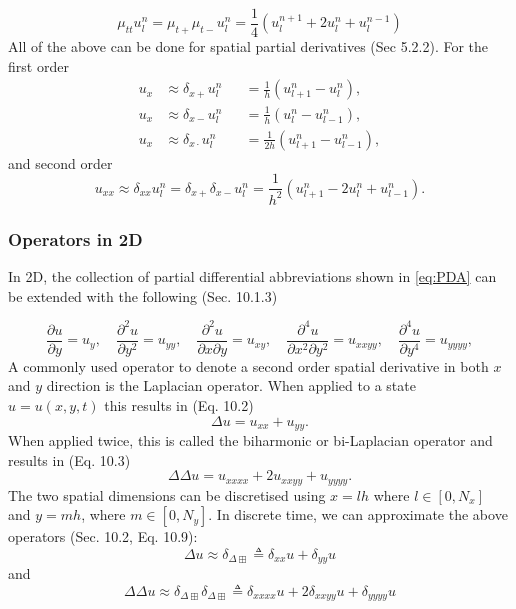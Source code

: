 \documentclass{article}
\begin{document}
\begin{equation}
    \mu_{tt} u_l^n = \mu_{t+}\mu_{t-}u_l^n = \frac{1}{4}(u_l^{n+1}+2u_l^n+u_l^{n-1})
\end{equation}
All of the above can be done for spatial partial derivatives (Sec 5.2.2). For the first order 
\begin{subequations}\label{eq:firstOrderSpace}
\begin{alignat}{2}
    u_x &\approx \delta_{x+}u_l^n &&= \frac{1}{h} (u_{l+1}^n - u_l^n),\\
    u_x &\approx \delta_{x-}u_l^n &&= \frac{1}{h} (u_l^n - u_{l-1}^n),\\
    u_x &\approx \delta_{x\cdot}u_l^n &&= \frac{1}{2h} (u_{l+1}^n - u_{l-1}^n),
\end{alignat}
\end{subequations}
and second order 
\begin{equation}\label{eq:secondOrderSpace}
    u_{xx} \approx \delta_{xx}u_l^n = \delta_{x+}\delta_{x-}u_l^n = \frac{1}{h^2} (u_{l+1}^n - 2u_l^n + u_{l-1}^n).
\end{equation}

\subsubsection{Operators in 2D}\label{subsec:2Doperators}
In 2D, the collection of partial differential abbreviations shown in \eqref{eq:PDA} can be extended with the following (Sec. 10.1.3)

\begin{equation}
    \frac{\partial u}{\partial y} = u_{y}, \quad \frac{\partial^2 u}{\partial y^2} = u_{yy}, \quad
    \frac{\partial^2 u}{\partial x\partial y} = u_{xy}, \quad
    \frac{\partial^4 u}{\partial x^2\partial y^2} = u_{xxyy}, \quad
    \frac{\partial^4 u}{\partial y^4} = u_{yyyy},
\end{equation}
A commonly used operator to denote a second order spatial derivative in both $x$ and $y$ direction is the Laplacian operator. When applied to a state $u=u(x,y,t)$ this results in (Eq. 10.2)
\begin{equation}
    \Delta u = u_{xx} + u_{yy}.
\end{equation}
When applied twice, this is called the biharmonic or bi-Laplacian operator and results in (Eq. 10.3) \begin{equation}
    \Delta\Delta u = u_{xxxx} + 2u_{xxyy} + u_{yyyy}.
\end{equation}
The two spatial dimensions can be discretised using $x=lh$ where $l\in[0,N_x]$ and $y=mh$, where $m\in[0,N_y]$. In discrete time, we can approximate the above operators (Sec. 10.2, Eq. 10.9):
\begin{equation}
    \Delta u \approx \delta_{\Delta\boxplus} \triangleq \delta_{xx}u + \delta_{yy}u
\end{equation}
and 
\begin{equation}
    \Delta\Delta u \approx \delta_{\Delta\boxplus}\delta_{\Delta\boxplus} \triangleq \delta_{xxxx}u + 2\delta_{xxyy}u + \delta_{yyyy}u
\end{equation}
\end{document}
